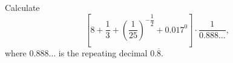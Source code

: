 Calculate
\[
\left[8+\dfrac{1}{3}+\left(\dfrac{1}{25}\right)^{-\dfrac{1}{2}}+0.017^{0}\right]\cdot\dfrac{1}{0.888\ldots},
\]
where $0.888\ldots$ is the repeating decimal $0.\overline{8}$.
